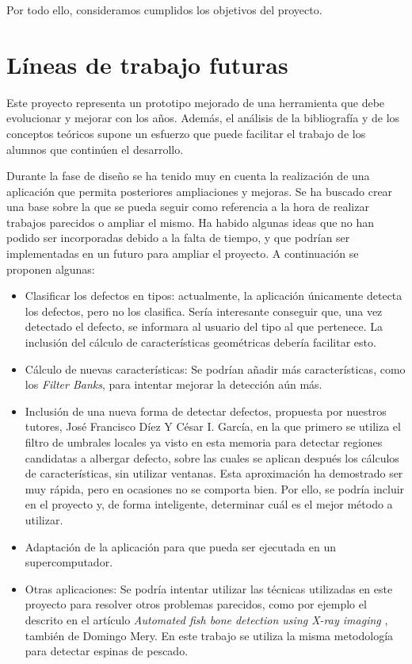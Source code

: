 Por todo ello, consideramos cumplidos los objetivos del proyecto.


\newpage
\section{Líneas de trabajo futuras}
Este proyecto representa un prototipo mejorado de una herramienta que debe evolucionar y mejorar con los años. Además, el análisis de la bibliografía y de los conceptos teóricos supone un esfuerzo que puede facilitar el trabajo de los alumnos que continúen el desarrollo. 

Durante la fase de diseño se ha tenido muy en cuenta la realización de una aplicación que permita posteriores ampliaciones y mejoras. Se ha buscado crear una base sobre la que se pueda seguir como referencia a la hora de realizar trabajos parecidos o ampliar el mismo. Ha habido algunas ideas que no han podido ser incorporadas debido a la falta de tiempo, y que podrían ser implementadas en un futuro para ampliar el proyecto. A continuación se proponen algunas:

\begin{itemize}
\item Clasificar los defectos en tipos: actualmente, la aplicación únicamente detecta los defectos, pero no los clasifica. Sería interesante conseguir que, una vez detectado el defecto, se informara al usuario del tipo al que pertenece. La inclusión del cálculo de características geométricas debería facilitar esto.
\item Cálculo de nuevas características: Se podrían añadir más características, como los \emph{Filter Banks}, para intentar mejorar la detección aún más.
\item Inclusión de una nueva forma de detectar defectos, propuesta por nuestros tutores, José Francisco Díez Y César I. García, en la que primero se utiliza el filtro de umbrales locales ya visto en esta memoria para detectar regiones candidatas a albergar defecto, sobre las cuales se aplican después los cálculos de características, sin utilizar ventanas. Esta aproximación ha demostrado ser muy rápida, pero en ocasiones no se comporta bien. Por ello, se podría incluir en el proyecto y, de forma inteligente, determinar cuál es el mejor método a utilizar.
\item Adaptación de la aplicación para que pueda ser ejecutada en un supercomputador.
\item Otras aplicaciones: Se podría intentar utilizar las técnicas utilizadas en este proyecto para resolver otros problemas parecidos, como por ejemplo el descrito en el artículo \emph{Automated fish bone detection using X-ray imaging} \cite{mery2011automated}, también de Domingo Mery. En este trabajo se utiliza la misma metodología para detectar espinas de pescado.
\end{itemize}

